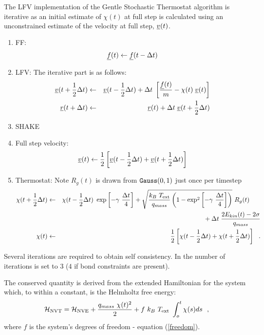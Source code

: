 The LFV implementation of the Gentle Stochastic Thermostat algorithm is
iterative as an initial estimate of $\chi (t)$ at full step is calculated using
an unconstrained estimate of the velocity at full step, $\mbox{$\underline{v}$}(t)$.
\begin{enumerate}
\item FF:
\begin{equation}
\mbox{$\underline{f}$}(t) \leftarrow \mbox{$\underline{f}$}(t - \Delta t)
\end{equation}
\item LFV: The iterative part is as follows:
\begin{eqnarray}
\mbox{$\underline{v}$}(t + {1 \over 2} \Delta t) &\leftarrow& \mbox{$\underline{v}$}(t - {1 \over 2} \Delta t) + \Delta t \;
\left[{\mbox{$\underline{f}$}(t) \over m} - \chi (t) \; \mbox{$\underline{v}$}(t) \right] \nonumber \\
\mbox{$\underline{r}$}(t + \Delta t) &\leftarrow& \mbox{$\underline{r}$}(t) + \Delta t \; \mbox{$\underline{v}$}(t + {1 \over 2} \Delta t)
\end{eqnarray}
\item SHAKE
\item Full step velocity:
\begin{equation}
\mbox{$\underline{v}$}(t) \leftarrow {1 \over 2} \left[ \mbox{$\underline{v}$}(t - {1 \over 2} \Delta t) +
\mbox{$\underline{v}$}(t + {1 \over 2} \Delta t) \right]
\end{equation}
\item Thermostat: Note $R_{g}(t)$ is drawn from ${\tt Gauss}(0,1)$ just once per timestep
\begin{eqnarray}
\chi (t + {1 \over 2} \Delta t) &\leftarrow& \chi (t - {1 \over 2} \Delta t) ~ \exp \left[-\gamma~{\Delta t \over 4} \right] +
\sqrt{\frac{k_{B}~T_{\rm ext}}{q_{mass}}\left(1-\exp^{2} \left[-\gamma~{\Delta t \over 4} \right]\right)}~R_{g}(t) \phantom{xxx} \nonumber \\
& &\phantom{xxxxxxxxxxxxxxxx} + \Delta t \; {{2 E_{kin}(t) - 2 \sigma} \over q_{mass}} \nonumber \\
\chi (t) &\leftarrow& {1 \over 2} \left[ \chi (t - {1 \over 2} \Delta t) +
\chi (t + {1 \over 2} \Delta t) \right]~~.
\end{eqnarray}
\end{enumerate}
Several iterations are required to obtain self consistency.  In \D
the number of iterations is set to $3$ ($4$ if bond constraints
are present).

The conserved quantity is derived from the extended Hamiltonian for
the system which, to within a constant, is the Helmholtz free
energy:
\begin{equation}
{\cal H}_{\rm NVT} = {\cal H}_{\rm NVE} + {q_{mass}~\chi (t)^{2} \over 2} +
f~k_{B}~T_{\rm ext}~\int_o^t \chi (s) ds~~,
\end{equation}
where $f$ is the system's degrees of freedom - equation
(\ref{freedom}).

